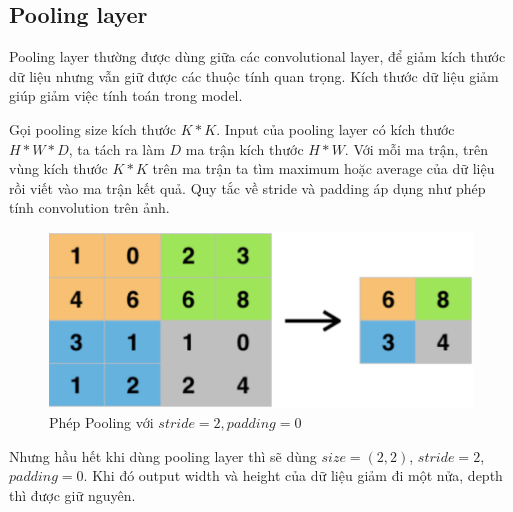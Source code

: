 \subsection{Pooling layer}
\label{ss:Pooling}
Pooling layer thường được dùng giữa các convolutional layer, để giảm kích thước dữ liệu nhưng vẫn giữ được các thuộc tính quan trọng. Kích thước dữ liệu giảm giúp giảm việc tính toán trong model.

Gọi pooling size kích thước $K*K$. Input của pooling layer có kích thước $H*W*D$, ta tách ra làm $D$ ma trận kích thước $H*W$. Với mỗi ma trận, trên vùng kích thước $K*K$ trên ma trận ta tìm maximum hoặc average của dữ liệu rồi viết vào ma trận kết quả. Quy tắc về stride và padding áp dụng như phép tính convolution trên ảnh.

\FloatBarrier
\begin{figure}[htp]
\begin{center}
\includegraphics[scale=0.3]{chap2/c2_figs/9.jpg}
\end{center}
\caption{Phép Pooling với $stride=2, padding=0$}
\label{fig:pooling}
\end{figure}
\FloatBarrier

Nhưng hầu hết khi dùng pooling layer thì sẽ dùng $size=(2,2)$, $stride=2$, $padding=0$. Khi đó output width và height của dữ liệu giảm đi một nửa, depth thì được giữ nguyên.

